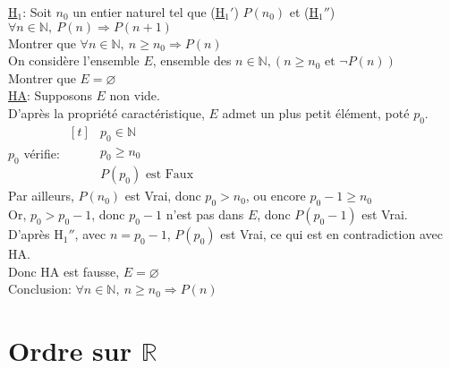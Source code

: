\documentclass[12pt,twoside,a4paper]{article}
\begin{document}
		\begin{preuve}
			\underline{H$_1$}: Soit $n_0$ un entier naturel tel que (\underline{H$_1'$}) $P(n_0)$ et (\underline{H$_1''$}) $\forall n\in\mathbb{N},\ P(n)\Rightarrow P(n+1)$\\
			Montrer que $\forall n\in\mathbb{N},\ n\geqslant n_0\Rightarrow P(n)$\\
			On consid\`ere l'ensemble $E$, ensemble des $n\in\mathbb{N}, (n\geqslant n_0\text{ et }\neg P(n))$\\
			Montrer que $E=\varnothing$\\
			\underline{HA}: Supposons $E$ non vide.\\
			D'apr\`es la propri\'et\'e caract\'eristique, $E$ admet un plus petit \'el\'ement, pot\'e $p_0$.\\
			$p_0$ v\'erifie: $\begin{aligned}[t] & p_0\in\mathbb{N}\\ & p_0\geqslant n_0 \\ & P(p_0)\text{ est Faux}\end{aligned}$\\
			Par ailleurs, $P(n_0)$ est Vrai, donc $p_0>n_0$, ou encore $p_0-1\geqslant n_0$\\
			Or, $p_0>p_0-1$, donc $p_0-1$ n'est pas dans $E$, donc $P(p_0-1)$ est Vrai.\\
			D'apr\`es H$_1''$, avec $n=p_0-1$, $P(p_0)$ est Vrai, ce qui est en contradiction avec HA.\\
			Donc HA est fausse, $E=\varnothing$\\
			Conclusion: $\forall n\in\mathbb{N},\ n\geqslant n_0\Rightarrow P(n)$
		\end{preuve}
	\section{Ordre sur $\mathbb{R}$}
\end{document}
